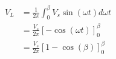 \subsection{}

\begin{center}
    \xdef\myBeta{225.787377}
       
    \vspace{2cm} \\
       
\end{center}

\begin{align*}
V_L & = \frac{1}{2\pi} \int_0^\beta V_s \sin(\omega t) d \omega t \\
    & = \frac{V_s}{2\pi} \left[ -\cos(\omega t) \right]_0^\beta \\
    & = \frac{V_s}{2\pi} \left[ 1- \cos(\beta) \right]_0^\beta \\
\end{align*}

